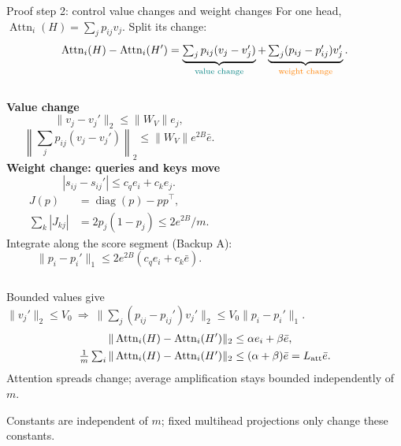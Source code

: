 \documentclass[aspectratio=169,11pt]{beamer}
\newcommand{\source}[1]{\par\vfill{\color{muted}\tiny #1}}
\begin{document}
\begin{frame}{Proof step 2: control value changes and weight changes}
\fontsize{9.5}{11.2}\selectfont
\setlength{\abovedisplayskip}{2pt}
\setlength{\belowdisplayskip}{2pt}
\setlength{\abovedisplayshortskip}{1pt}
\setlength{\belowdisplayshortskip}{1pt}
For one head, \(\operatorname{Attn}_i(H)=\sum_jp_{ij}v_j\). Split its change:
\[
\operatorname{Attn}_i(H)-\operatorname{Attn}_i(H')
=
\underbrace{\textstyle\textstyle\sum_jp_{ij}(v_j-v_j')}_{\textcolor{teal}{\text{value change}}}
+
\underbrace{\textstyle\sum_j(p_{ij}-p_{ij}')v_j'}_{\textcolor{orange}{\text{weight change}}}.
\]
\vspace{-3mm}
\begin{columns}[T,onlytextwidth]
{\color{teal}\textbf{Value change}}
\[
\|v_j-v_j'\|_2\le\|W_V\|e_j,
\]
\[
\left\|\textstyle\sum_jp_{ij}(v_j-v_j')\right\|_2
\le\|W_V\|e^{2B}\bar e.
\]
{\color{orange}\textbf{Weight change: queries and keys move}}
\[
|s_{ij}-s_{ij}'|\le c_qe_i+c_ke_j.
\]
\[
\begin{aligned}
J(p)&=\operatorname{diag}(p)-pp^\top,\\
\textstyle\sum_k|J_{kj}|&=2p_j(1-p_j)\le 2e^{2B}/m.
\end{aligned}
\]
Integrate along the score segment (Backup A):
\[
\|p_i-p_i'\|_1\le2e^{2B}(c_qe_i+c_k\bar e).
\]
\end{columns}
\vspace{1mm}
Bounded values give
\(\|v_j'\|_2\le V_0\ \Longrightarrow\
\|\sum_j(p_{ij}-p_{ij}')v_j'\|_2\le V_0\|p_i-p_i'\|_1.\)
\vspace{-1mm}
\[
\begin{aligned}
\|\operatorname{Attn}_i(H)-\operatorname{Attn}_i(H')\|_2
&\le\alpha e_i+\beta\bar e,\\
\textstyle\frac1m\sum_i\|\operatorname{Attn}_i(H)-\operatorname{Attn}_i(H')\|_2
&\le(\alpha+\beta)\bar e=L_{\rm att}\bar e.
\end{aligned}
\]
{\color{teal}Attention spreads change; average amplification stays bounded independently of \(m\).}
\source{Constants are independent of \(m\); fixed multihead projections only change these constants.}
\end{frame}
\end{document}

